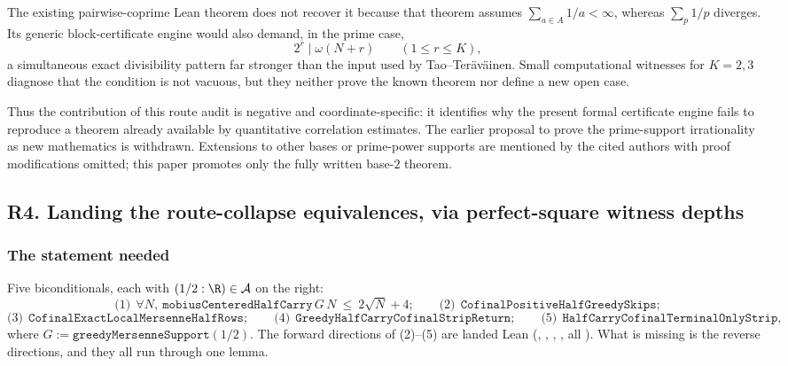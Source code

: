 The existing pairwise-coprime Lean theorem does not recover it because that
theorem assumes $\sum_{a\in A}1/a<\infty$, whereas $\sum_p1/p$ diverges.  Its
generic block-certificate engine would also demand, in the prime case,
\[
  2^r\mid\omega(N+r)\qquad(1\le r\le K),
\]
a simultaneous exact divisibility pattern far stronger than the input used
by Tao--Ter\"av\"ainen.  Small computational witnesses for $K=2,3$ diagnose
that the condition is not vacuous, but they neither prove the known theorem
nor define a new open case.

Thus the contribution of this route audit is negative and
coordinate-specific: it identifies why the present formal certificate
engine fails to reproduce a theorem already available by quantitative
correlation estimates.  The earlier proposal to prove the prime-support
irrationality as new mathematics is withdrawn.  Extensions to other bases
or prime-power supports are mentioned by the cited authors with proof
modifications omitted; this paper promotes only the fully written base-$2$
theorem.

\subsection{R4. Landing the route-collapse equivalences, via perfect-square witness depths}
\label{sec:invent-R4}

\subsubsection*{The statement needed}

Five biconditionals, each with $(1/2:\R)\in\mathcal{A}$ on the right:
\[
\text{(1)}\ \ \forall N,\ \mathtt{mobiusCenteredHalfCarry}\,G\,N\ \le\ 2\sqrt{N}+4;
\qquad
\text{(2)}\ \ \mathtt{CofinalPositiveHalfGreedySkips};
\]
\[
\text{(3)}\ \ \mathtt{CofinalExactLocalMersenneHalfRows};
\qquad
\text{(4)}\ \ \mathtt{GreedyHalfCarryCofinalStripReturn};
\qquad
\text{(5)}\ \ \mathtt{HalfCarryCofinalTerminalOnlyStrip},
\]
where $G:=\mathtt{greedyMersenneSupport}(1/2)$. The forward directions of (2)--(5) are landed
Lean (,
,
,
,
all ). What is missing is the reverse directions, and they all run through one lemma.

